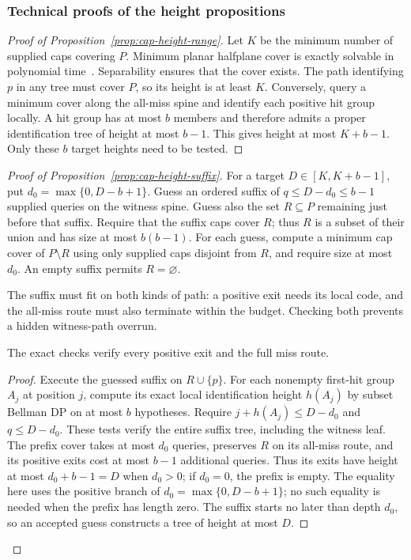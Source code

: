 \subsubsection{Technical proofs of the height propositions}

\begin{proof}[Proof of Proposition~\ref{prop:cap-height-range}]
Let $K$ be the minimum number of supplied caps covering $P$.
Minimum planar halfplane cover is exactly solvable in polynomial
time~\cite{harpeledlee2012}. Separability ensures that the cover
exists. The path identifying $p$ in any tree must cover $P$, so
its height is at least $K$. Conversely, query a minimum cover along
the all-miss spine and identify each positive hit group locally.
A hit group has at most $b$ members and therefore admits a proper
identification tree of height at most $b-1$. This gives height at
most $K+b-1$. Only these $b$ target heights need to be tested.

\end{proof}

\begin{proof}[Proof of Proposition~\ref{prop:cap-height-suffix}]
For a target $D\in[K,K+b-1]$, put $d_0=\max\{0,D-b+1\}$.
Guess an ordered suffix of $q\le D-d_0\le b-1$ supplied queries
on the witness spine. Guess also the set $R\subseteq P$ remaining
just before that suffix. Require that the suffix caps cover $R$;
thus $R$ is a subset of their union and has size at most $b(b-1)$.
For each guess, compute a minimum cap cover of $P\setminus R$
using only supplied caps disjoint from $R$, and require size at
most $d_0$. An empty suffix permits $R=\varnothing$.

The suffix must fit on both kinds of path: a positive exit needs
its local code, and the all-miss route must also terminate within
the budget. Checking both prevents a hidden witness-path overrun.

\begin{claim}
The exact checks verify every positive exit and the full miss route.
\end{claim}
\begin{proof}
Execute the guessed suffix on $R\cup\{p\}$. For each nonempty
first-hit group $A_j$ at position $j$, compute its exact local
identification height $h(A_j)$ by subset Bellman DP on at most
$b$ hypotheses. Require $j+h(A_j)\le D-d_0$ and $q\le D-d_0$.
These tests verify the entire suffix tree, including the witness
leaf. The prefix cover takes at most $d_0$ queries, preserves $R$
on its all-miss route, and its positive exits cost at most $b-1$
additional queries. Thus its exits have height at most
$d_0+b-1=D$ when $d_0>0$; if $d_0=0$, the prefix is empty.
The equality here uses the positive branch of
$d_0=\max\{0,D-b+1\}$; no such equality is needed when the prefix
has length zero.
The suffix starts no later than depth $d_0$, so an accepted guess
constructs a tree of height at most $D$.

\end{proof}
\end{proof}


